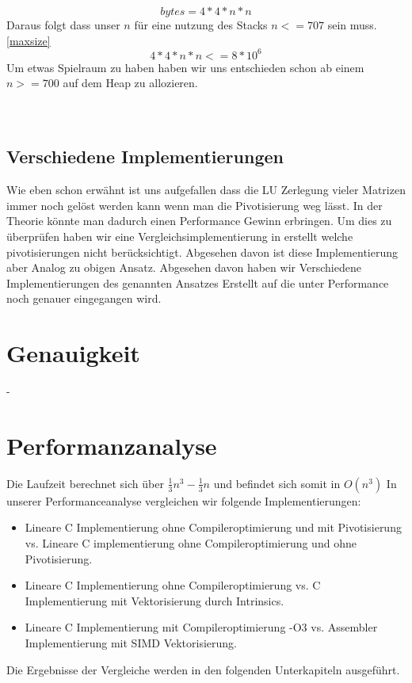 \documentclass[course=erap]{aspdoc}
\begin{document}
 \begin{equation}
 \label{size}
  bytes = 4*4*n*n
 \end{equation}
Daraus folgt dass unser $n$ für eine nutzung des Stacks  $n <= 707$  sein muss.\ref{maxsize}
 \begin{equation}
 \label{maxsize}
  4*4*n*n <= 8*10^6
 \end{equation}
 Um etwas Spielraum zu haben haben wir uns entschieden schon ab einem $n >= 700$ auf dem Heap zu allozieren.\\\\\\


\subsection{Verschiedene Implementierungen}
Wie eben schon erwähnt ist uns aufgefallen dass die LU Zerlegung vieler Matrizen immer noch gelöst werden kann wenn man die Pivotisierung weg lässt. In der Theorie könnte man dadurch einen Performance Gewinn erbringen. 
Um dies zu überprüfen haben wir eine Vergleichsimplementierung in erstellt welche pivotisierungen nicht berücksichtigt. Abgesehen davon ist diese Implementierung aber Analog zu obigen Ansatz.
Abgesehen davon haben wir Verschiedene Implementierungen des genannten Ansatzes Erstellt auf die unter Performance noch genauer eingegangen wird.


\section{Genauigkeit}
- 

\section{Performanzanalyse}
Die Laufzeit berechnet sich über  $ \frac{1}{3}n^3 -\frac{1}{3} n $ und befindet sich somit in $O(n^3)$ \cite{LULaufzeit}
In unserer Performanceanalyse vergleichen wir folgende Implementierungen:\\
\begin{itemize}
\item Lineare C Implementierung ohne Compileroptimierung und mit Pivotisierung vs. Lineare C implementierung ohne Compileroptimierung und ohne Pivotisierung. 
\item Lineare C Implementierung ohne Compileroptimierung vs. C Implementierung mit Vektorisierung durch Intrinsics. 
\item Lineare C Implementierung mit Compileroptimierung -O3 vs. Assembler Implementierung mit SIMD Vektorisierung.
\end{itemize}
Die Ergebnisse der Vergleiche werden in den folgenden Unterkapiteln ausgeführt. \\
\\
\end{document}
